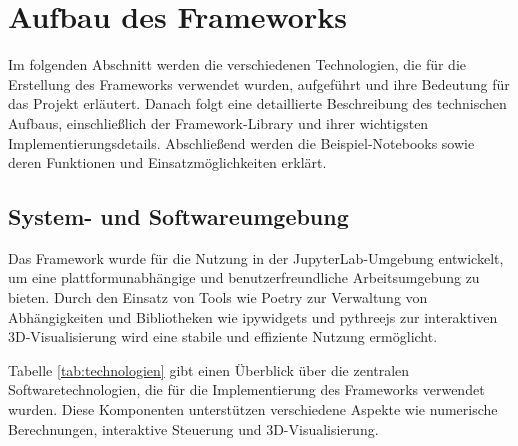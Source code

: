\section{Aufbau des Frameworks}
Im folgenden Abschnitt werden die verschiedenen Technologien, die für die Erstellung des Frameworks verwendet wurden,
aufgeführt und ihre Bedeutung für das Projekt erläutert. Danach folgt eine detaillierte Beschreibung des technischen Aufbaus,
einschließlich der Framework-Library und ihrer wichtigsten Implementierungsdetails.
Abschließend werden die Beispiel-Notebooks sowie deren Funktionen und Einsatz\-möglichkeiten erklärt.


\subsection{System- und Softwareumgebung}
Das Framework wurde für die Nutzung in der JupyterLab-Umgebung entwickelt, um eine plattformunabhängige und benutzerfreundliche Arbeitsumgebung zu bieten.
Durch den Einsatz von Tools wie Poetry zur Verwaltung von Abhängigkeiten und Bibliotheken wie ipywidgets und pythreejs zur
interaktiven 3D-Visualisierung wird eine stabile und effiziente Nutzung ermöglicht.


Tabelle \ref{tab:technologien} gibt einen Überblick über die zentralen Softwaretechnologien,
die für die Implementierung des Frameworks verwendet wurden. Diese Komponenten unterstützen verschiedene Aspekte wie numerische Berechnungen,
interaktive Steuerung und 3D-Visualisierung.

